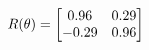 \documentclass[preview]{standalone}
\begin{document}
\begin{align*}
\special{dvisvgm:raw <g id='unique000'>}R(\theta) = \begin{bmatrix}0.96 & 0.29\\-0.29 & 0.96\end{bmatrix}\special{dvisvgm:raw </g>}
\end{align*}
\end{document}
